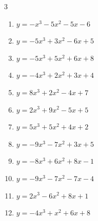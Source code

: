 \begin{multicols}{3}
\begin{enumerate}

  \item $y=-x^{3}-5x^{2}-5x-6$


  \item $y=-5x^{3}+3x^{2}-6x+5$


  \item $y=-5x^{3}+5x^{2}+6x+8$


  \item $y=-4x^{3}+2x^{2}+3x+4$


  \item $y=8x^{3}+2x^{2}-4x+7$


\columnbreak %

  \item $y=2x^{3}+9x^{2}-5x+5$


  \item $y=5x^{3}+5x^{2}+4x+2$


  \item $y=-9x^{3}-7x^{2}+3x+5$


  \item $y=-8x^{3}+6x^{2}+8x-1$


  \item $y=-9x^{3}-7x^{2}-7x-4$


  \item $y=2x^{3}-6x^{2}+8x+1$


  \item $y=-4x^{3}+x^{2}+6x+8$


\end{enumerate}
\end{multicols}
